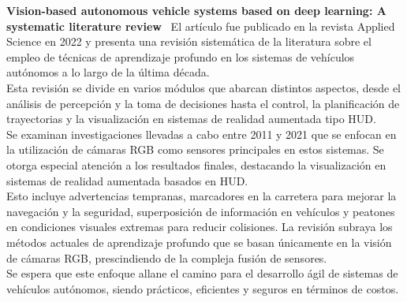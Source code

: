 \textbf{Vision-based autonomous vehicle systems based on deep learning: A systematic literature review}~\cite{pavel2022vision}
El artículo fue publicado en la revista Applied Science en 2022 y presenta una revisión sistemática de la literatura sobre el empleo
de técnicas de aprendizaje profundo en los sistemas
de vehículos autónomos a lo largo de la última década.                                                                    \\Esta revisión se divide en varios módulos que abarcan distintos aspectos,
desde el análisis de percepción y la toma de decisiones hasta el control, la planificación de trayectorias
y la visualización en sistemas de realidad aumentada tipo HUD.                                                                                                                   \\
Se examinan investigaciones llevadas a cabo entre 2011 y 2021 que se enfocan en la utilización de cámaras RGB como sensores principales
en estos sistemas. Se otorga especial atención a los resultados finales, destacando la visualización en sistemas de realidad aumentada
basados en HUD.                                                                                                      \\Esto incluye advertencias tempranas, marcadores en la carretera para mejorar la navegación y la seguridad, superposición
de información en vehículos y peatones en condiciones visuales extremas para reducir colisiones.
La revisión subraya los métodos actuales de aprendizaje profundo que se basan únicamente en la visión de cámaras RGB, prescindiendo de la
compleja fusión de sensores.                                                                     \\Se espera que este enfoque allane el camino para el desarrollo ágil de sistemas de vehículos autónomos,
siendo prácticos, eficientes y seguros en términos de costos.                                                               \\
